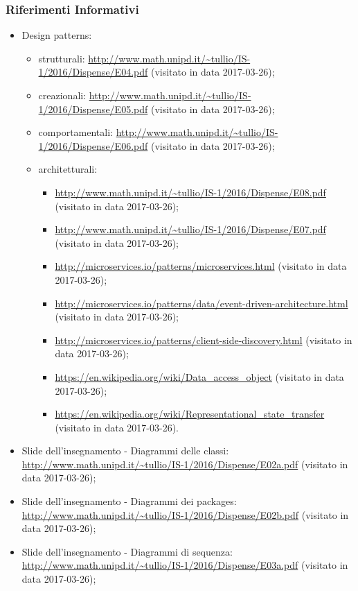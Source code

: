 	 \subsubsection{Riferimenti Informativi}
	  \begin{itemize}
	    \item Design patterns:
	      \begin{itemize}
	       \item strutturali:
	       \url{http://www.math.unipd.it/~tullio/IS-1/2016/Dispense/E04.pdf} (visitato in data 2017-03-26);
	       \item creazionali:
	       \url{http://www.math.unipd.it/~tullio/IS-1/2016/Dispense/E05.pdf} (visitato in data 2017-03-26);
	       \item comportamentali:
	       \url{http://www.math.unipd.it/~tullio/IS-1/2016/Dispense/E06.pdf} (visitato in data 2017-03-26);
	       \item architetturali:
	       \begin{itemize}
	       \item \url{http://www.math.unipd.it/~tullio/IS-1/2016/Dispense/E08.pdf} (visitato in data 2017-03-26);
	       \item \url{http://www.math.unipd.it/~tullio/IS-1/2016/Dispense/E07.pdf} (visitato in data 2017-03-26);
	       \item \url{http://microservices.io/patterns/microservices.html} (visitato in data 2017-03-26);
	       \item \url{http://microservices.io/patterns/data/event-driven-architecture.html} (visitato in data 2017-03-26);
	       \item \url{http://microservices.io/patterns/client-side-discovery.html} (visitato in data 2017-03-26);
	       \item \url{https://en.wikipedia.org/wiki/Data_access_object} (visitato in data 2017-03-26);
	       \item \url{https://en.wikipedia.org/wiki/Representational_state_transfer} (visitato in data 2017-03-26).
	       \end{itemize}
	      \end{itemize}
	    \item Slide dell’insegnamento - Diagrammi delle classi:
	    \url{http://www.math.unipd.it/~tullio/IS-1/2016/Dispense/E02a.pdf} (visitato in data 2017-03-26);
	    \item Slide dell’insegnamento - Diagrammi dei packages:
	    \url{http://www.math.unipd.it/~tullio/IS-1/2016/Dispense/E02b.pdf} (visitato in data 2017-03-26);
	    \item Slide dell’insegnamento - Diagrammi di sequenza:
	    \url{http://www.math.unipd.it/~tullio/IS-1/2016/Dispense/E03a.pdf} (visitato in data 2017-03-26); 
	  \end{itemize}
	  
	  